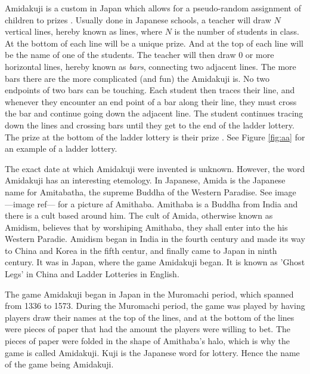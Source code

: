 
Amidakuji is a custom in Japan which 
allows for a pseudo-random assignment of children to prizes \cite{A23}. 
Usually done in Japanese schools, a teacher will draw $N$ vertical lines, 
hereby known as lines, where $N$ is the number of students in class. 
At the bottom of each line will be a unique prize. 
And at the top of each line will be the name of one of the students.  
The teacher will then draw 0 or more horizontal lines, hereby known as \emph{bars}, 
connecting two adjacent lines. The more bars there are the more complicated (and fun) 
the Amidakuji is. No two endpoints of two bars can be touching. Each student then traces 
their line, and whenever they encounter an end point of a bar along their line, 
they must cross the bar and continue going down the adjacent line. 
The student continues tracing down the lines and crossing bars 
until they get to the end of the ladder lottery. The prize at the bottom of the ladder lottery 
is their prize \cite{A7}. See Figure \ref{fig:aa} for an example of a ladder lottery.\par
The exact date at which Amidakuji were invented is unknown. However, the word Amidakuji has
an interesting etemology. In Japanese, Amida is the Japanese name 
for Amitabatha, the supreme Buddha of the Western Paradise. See image ---image ref---
for a picture af Amithaba. Amithaba
is a Buddha from India and there is a cult based around him. The cult 
of Amida, otherwise known as Amidism, believes that by worshiping Amithaba, they shall 
enter into the his Western Paradie. Amidism began in India in the fourth century
and made its way to China and Korea in the fifth centur, and finally  came 
to Japan in ninth century. It was in Japan, where the game Amidakuji
began. It is known as 'Ghost Legs' in China and  Ladder Lotteries in English.\par
The game Amidakuji began in Japan in the Muromachi period, which spanned from
1336 to 1573. During the Muromachi period, the game was played by having
players draw their names at the top of the lines, and at the bottom 
of the lines were pieces of paper that had the amount the players
were willing to bet. The pieces of paper were folded in the shape of 
Amithaba's halo, which is why the game is called Amidakuji. Kuji 
is the Japanese word for lottery. Hence the name of the game being 
Amidakuji.\par 

